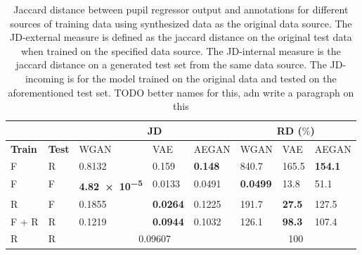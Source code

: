 \begin{table}[t]
    \centering
    \caption{Jaccard distance between pupil regressor output and annotations for different sources of training data using synthesized data as the original data source. The JD-external measure is defined as the jaccard distance on the original test data when trained on the specified data source. The JD-internal measure is the jaccard distance on a generated test set from the same data source. The JD-incoming is for the model trained on the original data and tested on the aforementioned test set. TODO better names for this, adn write a paragraph on this}
    \label{tab:quantitative_results}
    \begin{tabular}{|ll|lll|lll|}
        \cline{3-8}
        \multicolumn{2}{c}{ } & \multicolumn{3}{|c|}{JD} & \multicolumn{3}{c|}{RD ($\%$)} \\ \hline
        \textbf{Train} & \textbf{Test} & WGAN & VAE & AEGAN & WGAN & VAE & AEGAN \\ \hline
        F & R & \num{0.8132} & \num{0.159} & \textbf{\num{0.148}} & \num{840.7} & \num{165.5} & \textbf{\num{154.1}} \\
        F & F & \textbf{\num{4.82e-5}} & \num{0.0133} & \num{0.0491} & \textbf{\num{0.0499}} & \num{13.8} & \num{51.1} \\ 
        R & F & \num{0.1855} & \textbf{\num{0.0264}} & \num{0.1225} & \num{191.7} & \textbf{\num{27.5}} & \num{127.5} \\ 
        F + R & R & \num{0.1219} & \textbf{\num{0.0944}} & \num{0.1032} & \num{126.1} & \textbf{\num{98.3}} & \num{107.4} \\ 
        \hline
        R & R & \multicolumn{3}{c|}{\num{0.09607}} & \multicolumn{3}{c|}{\num{100}} \\
        \hline
    \end{tabular}
\end{table}

